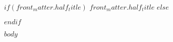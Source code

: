 \documentclass[$for(class_options)$$class_options$$sep$,$endfor$]{novel}
\begin{document}
\frontmatter

\thispagestyle{empty}
$if(front_matter.half_title)$
$front_matter.half_title$
$else$
\vspace*{6\nbs}
\hfill\charscale[2.4]{\textbf{\theTitle}}\par
$endif$

$body$
\end{document}
